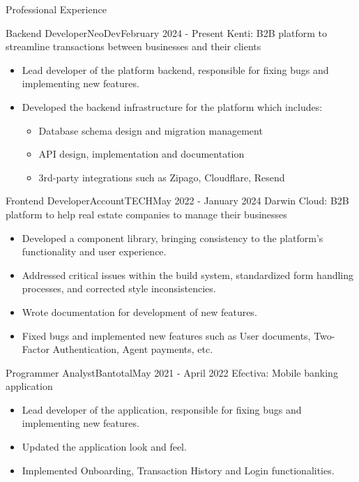 \documentclass[]{mcdowell-cv/mcdowellcv}
\begin{document}
    \makeheader

    \begin{cvsection}{Professional Experience}
        \begin{cvsubsection}{Backend Developer}{NeoDev}{February 2024 - Present}
            Kenti: B2B platform to streamline transactions between businesses and their clients
            \begin{itemize}
                \item Lead developer of the platform backend, responsible for fixing bugs and implementing new features.
                \item Developed the backend infrastructure for the platform which includes:
                \begin{itemize}
                    \item Database schema design and migration management
                    \item API design, implementation and documentation
                    \item 3rd-party integrations such as Zipago, Cloudflare, Resend
                \end{itemize}
            \end{itemize}
        \end{cvsubsection}

        \begin{cvsubsection}{Frontend Developer}{AccountTECH}{May 2022 - January 2024}
            Darwin Cloud: B2B platform to help real estate companies to manage their businesses
            \begin{itemize}
                \item Developed a component library, bringing consistency to the platform's functionality and user experience.
                \item Addressed critical issues within the build system, standardized form handling processes, and corrected style inconsistencies.
                \item Wrote documentation for development of new features.
                \item Fixed bugs and implemented new features such as User documents, Two-Factor Authentication, Agent payments, etc.
            \end{itemize}
        \end{cvsubsection}

        \begin{cvsubsection}{Programmer Analyst}{Bantotal}{May 2021 - April 2022}
            Efectiva: Mobile banking application
            \begin{itemize}
                \item Lead developer of the application, responsible for fixing bugs and implementing new features.
                \item Updated the application look and feel.
                \item Implemented Onboarding, Transaction History and Login functionalities.
            \end{itemize}


\end{cvsubsection}
\end{cvsection}
\end{document}
